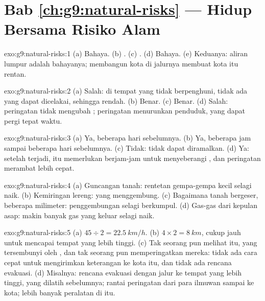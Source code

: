 \section*{Bab \ref{ch:g9:natural-risks} --- Hidup Bersama Risiko Alam}

\begin{solution}{exo:g9:natural-risks:1}
(a) Bahaya. (b) . (c) . (d) Bahaya. (e) Keduanya:
aliran lumpur adalah bahayanya; membangun kota di jalurnya membuat kota
itu rentan.
\end{solution}

\begin{solution}{exo:g9:natural-risks:2}
(a) Salah: di tempat yang tidak berpenghuni, tidak ada yang dapat
dicelakai, sehingga  rendah. (b) Benar. (c) Benar. (d) Salah:
peringatan tidak mengubah ; peringatan menurunkan 
penduduk, yang dapat pergi tepat waktu.
\end{solution}

\begin{solution}{exo:g9:natural-risks:3}
(a) Ya, beberapa hari sebelumnya. (b) Ya, beberapa jam sampai beberapa
hari sebelumnya. (c) Tidak:  tidak dapat diramalkan. (d) Ya:
setelah  terjadi,  itu memerlukan berjam-jam untuk
menyeberangi , dan peringatan merambat lebih cepat.
\end{solution}

\begin{solution}{exo:g9:natural-risks:4}
(a) Guncangan tanah: rentetan gempa-gempa kecil selagi  naik.
(b) Kemiringan lereng:  yang menggembung. (c) Bagaimana tanah
bergeser, beberapa milimeter: penggembungan selagi  berkumpul.
(d) Gas-gas dari kepulan asap: makin banyak gas yang keluar selagi 
naik.
\end{solution}

\begin{solution}{exo:g9:natural-risks:5}
(a) $45 \div 2 = \qty{22.5}{km/h}$. (b) $4 \times 2 = \qty{8}{km}$, cukup
jauh untuk mencapai tempat yang lebih tinggi. (c) Tak seorang pun melihat
 itu, yang tersembunyi oleh , dan tak seorang pun
memperingatkan mereka: tidak ada cara cepat untuk mengirimkan keterangan
ke kota itu, dan tidak ada rencana evakuasi. (d) Misalnya: rencana
evakuasi dengan jalur ke tempat yang lebih tinggi, yang dilatih
sebelumnya; rantai peringatan dari para ilmuwan sampai ke kota; lebih
banyak peralatan di  itu.
\end{solution}

